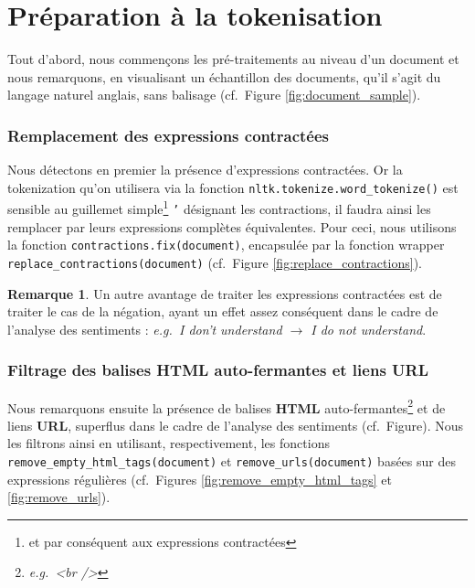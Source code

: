 \documentclass[12pt,a4paper]{report}
\theoremstyle{definition}
\newtheorem*{remark}{Remarque}
\begin{document}
\section{Préparation à la tokenisation}
Tout d'abord, nous commençons les pré-traitements au niveau d'un document et nous remarquons, en visualisant un échantillon des documents, qu'il s'agit du langage naturel anglais, sans balisage (cf.~Figure \ref{fig:document_sample}).

\subsubsection{Remplacement des expressions contractées}
Nous détectons en premier la présence d'expressions contractées. Or la tokenization qu'on utilisera via la fonction \texttt{nltk.tokenize.word\_tokenize()} est sensible au guillemet simple\footnote{et par conséquent aux expressions contractées} \og \texttt{'} \fg désignant les contractions, il faudra ainsi les remplacer par leurs expressions complètes équivalentes. Pour ceci, nous utilisons la fonction \texttt{contractions.fix(document)}, encapsulée par la fonction wrapper \texttt{replace\_contractions(document)} (cf.~Figure \ref{fig:replace_contractions}).

\begin{remark}
  Un autre avantage de traiter les expressions contractées est de traiter le cas de la négation, ayant un effet assez conséquent dans le cadre de l'analyse des sentiments : \emph{e.g.~I don't understand $\rightarrow$ I do not understand}.
\end{remark}

\subsubsection{Filtrage des balises HTML auto-fermantes et liens URL}
Nous remarquons ensuite la présence de balises \textbf{HTML} auto-fermantes\footnote{\emph{e.g.~<br />}} et de liens \textbf{URL}, superflus dans le cadre de l'analyse des sentiments (cf.~Figure). Nous les filtrons ainsi en utilisant, respectivement, les fonctions \texttt{remove\_empty\_html\_tags(document)} et \texttt{remove\_urls(document)} basées sur des expressions régulières (cf.~Figures \ref{fig:remove_empty_html_tags} et \ref{fig:remove_urls}).
\end{document}
